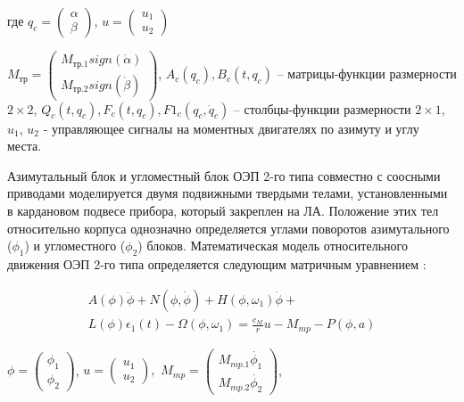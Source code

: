 где
$q_c=\left(\begin{array}{cc}
\alpha{} \\
\beta{}
\end{array}\right)$, 
$u=\left(\begin{array}{
	cc}
u_1 \\
u_2
\end{array}\right)$

$M_{\textit{тр}}=\left(\begin{array}{
		cc}
	M_{\textit{тр.1}}sign\left(\dot{\alpha{}}\right) \\
	M_{\textit{тр.2}}sign\left(\dot{\beta{}}\right)
\end{array}\right)$, 
$A_c\left(q_c\right),B_c\left(t,q_c\right)$ – матрицы-функции размерности $2 \times 2$,
$Q_c\left(t,q_c\right),F_c\left(t,q_c\right),F1_c\left(q_c,{\dot{q}}_c\right)$ – столбцы-функции размерности $2 \times 1$,
$u_1$, $u_2$ - управляющее сигналы на моментных двигателях по азимуту и углу места. 

Азимутальный блок и угломестный блок ОЭП 2-го типа совместно с соосными приводами моделируется двумя подвижными твердыми телами, установленными в кардановом подвесе прибора, который закреплен на ЛА. Положение этих тел относительно корпуса однозначно определяется углами поворотов азимутального ($\phi_1$) и угломестного ($\phi_2$) блоков. Математическая модель относительного движения ОЭП 2-го типа определяется следующим матричным уравнением \cite[]{Baloev16}:

\begin{equation}
\label{eq:p2:7-}
\begin{alignedat}{2}
A\left(\phi{}\right)\ddot{\phi{}}+N\left(\phi{},\dot{\phi{}}\right)+H\left(\phi{},{\omega{}}_1\right)\dot{\phi{}}+\\
L\left(\phi{}\right){\epsilon{}}_1(t)-\Omega{}\left(\phi{},{\omega{}}_1\right)=\frac{c_M}{r}u-M_{mp}-P\left(\phi{},a\right)
\end{alignedat}
\end{equation}

$\phi{}=\left(\begin{array}{
	cc}
{\phi{}}_1 \\
{\phi{}}_2
\end{array}\right)$, $u=\left(\begin{array}{
	cc}
u_1 \\
u_2
\end{array}\right),$ $M_{mp}=\left(\begin{array}{
	cc}
M_{\textit{mp.1}} \dot{\phi_1} \\
M_{\textit{mp.2}} \dot{\phi_2}
\end{array}\right)$,

